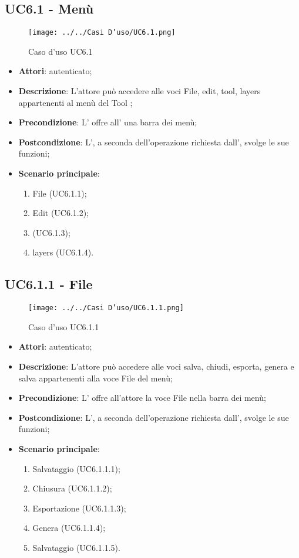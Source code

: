 \subsection{UC6.1 - Menù}
\label{ssec:UC6.1}
\begin{figure}[h!]
\centering
\texttt{[image: ../../Casi D'uso/UC6.1.png]}
\caption{Caso d'uso UC6.1}
 \end{figure}
\begin{itemize}
\item \textbf{Attori}:  autenticato;
\item \textbf{Descrizione}: L’attore può accedere alle voci File, edit, tool,
layers appartenenti al menù del Tool ;
\item \textbf{Precondizione}: L’ offre all’ una barra dei menù;
\item \textbf{Postcondizione}: L’, a seconda dell’operazione richiesta dall’,
svolge le sue funzioni;
\item \textbf{Scenario principale}: \begin{enumerate}\item File (UC6.1.1);\item Edit (UC6.1.2);\item {} (UC6.1.3);\item layers (UC6.1.4).
 \end{enumerate}
\end{itemize}
\newpage
\subsection{UC6.1.1 - File}
\label{ssec:UC6.1.1}
\begin{figure}[h!]
\centering
\texttt{[image: ../../Casi D'uso/UC6.1.1.png]}
\caption{Caso d'uso UC6.1.1}
 \end{figure}
\begin{itemize}
\item \textbf{Attori}:  autenticato;
\item \textbf{Descrizione}: L’attore può accedere alle voci salva, chiudi, esporta, genera  e salva  appartenenti alla voce File del menù;
\item \textbf{Precondizione}: L’ offre all’attore la voce File nella barra dei menù;
\item \textbf{Postcondizione}: L’, a seconda dell’operazione richiesta dall’,
svolge le sue funzioni;
\item \textbf{Scenario principale}: \begin{enumerate}\item Salvataggio (UC6.1.1.1);\item Chiusura (UC6.1.1.2);\item Esportazione (UC6.1.1.3);\item Genera  (UC6.1.1.4);\item Salvataggio  (UC6.1.1.5).
 \end{enumerate}
\end{itemize}
\newpage
